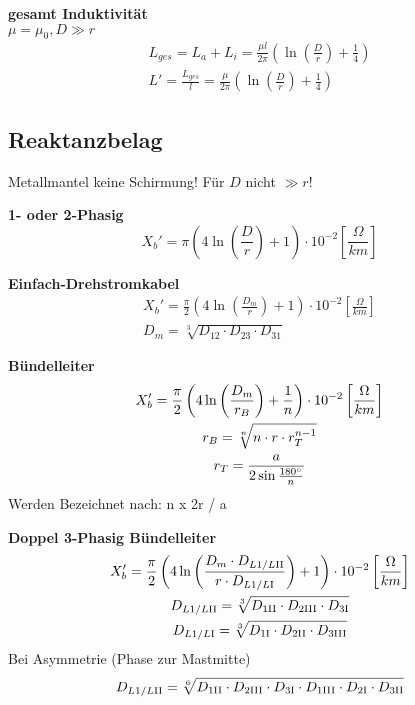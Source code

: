 \textbf{gesamt Induktivität}\\
\textcolor{dgreen}{$\mu = \mu_{0}, D \gg r$}
\begin{gather*}
    L_{ges} = L_{a} + L_{i} = \frac{\mu l}{2\pi} \left( \ln \left(\frac{D}{r}\right) + \frac{1}{4}\right)\\
    L' = \frac{L_{ges}}{l} = \frac{\mu }{2\pi} \left( \ln \left(\frac{D}{r}\right) + \frac{1}{4}\right)
\end{gather*}

\subsection{Reaktanzbelag}
Metallmantel keine Schirmung! Für $D$ nicht $\gg r$!

\textbf{1- oder 2-Phasig}
\begin{equation*}
    X_{b}' = \pi \left( 4 \ln \left( \frac{D}{r}\right) +1 \right) \cdot 10 ^{-2}   \left[\frac{\Omega}{km}\right]
\end{equation*}

\textbf{Einfach-Drehstromkabel}
\begin{gather*}
    X_{b}' = \frac{\pi}{2} \left( 4 \ln \left( \frac{D_{m}}{r}\right) +1 \right) \cdot 10 ^{-2}   \left[\frac{\Omega}{km}\right]\\
    D_{m} = \sqrt[3]{D_{12} \cdot D_{23} \cdot D_{31}}
\end{gather*}

\textbf{Bündelleiter}
\begin{gather*}
    X_{b}' = \frac{\pi}{2} \left( 4 \ln \left( \frac{D_{m}}{r_{B}}\right) + \frac{1}{n} \right) \cdot 10 ^{-2}   \left[\frac{\Omega}{km}\right]\\
    r_{B} = \sqrt[n]{n \cdot r \cdot r_{T}^{n-1}}\\
    r_{T} = \frac{a}{2 \sin \frac{180 \degree}{n}}
\end{gather*}
Werden Bezeichnet nach: n x 2r / a

\textbf{Doppel 3-Phasig Bündelleiter}
\begin{gather*}
    X_{b}' = \frac{\pi}{2} \left( 4 \ln \left( \frac{D_{m} \cdot D_{L1/L\RN{2}}}{r \cdot D_{L1/L\RN{1}}}\right) + 1 \right) \cdot 10 ^{-2}   \left[\frac{\Omega}{km}\right]\\
    D_{L1/L\RN{2}} = \sqrt[3]{D_{1\RN{2}} \cdot D_{2\RN{3}} \cdot D_{3\RN{1}}}\\
    D_{L1/L\RN{1}} = \sqrt[3]{D_{1\RN{1}} \cdot D_{2\RN{2}} \cdot D_{3\RN{3}}}
\end{gather*}
Bei Asymmetrie (Phase zur Mastmitte)
\begin{equation*}
    D_{L1/L\RN{2}} = \sqrt[6]{D_{1\RN{2}} \cdot D_{2\RN{3}} \cdot D_{3\RN{1}} \cdot D_{1\RN{3}} \cdot D_{2\RN{1}} \cdot D_{3\RN{2}}}
\end{equation*} 